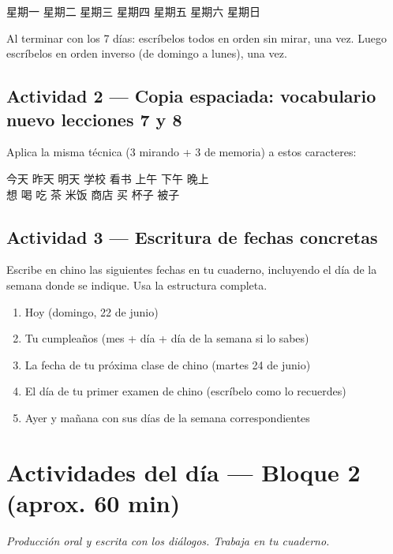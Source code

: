 \documentclass[12pt, a4paper]{article}
\begin{document}
\begin{cuadrogris}
星期一 \quad 星期二 \quad 星期三 \quad 星期四 \quad 星期五 \quad 星期六 \quad 星期日
\end{cuadrogris}

Al terminar con los 7 días: escríbelos todos en orden sin mirar, una vez. Luego escríbelos en orden inverso (de domingo a lunes), una vez.

\subsection{Actividad 2 — Copia espaciada: vocabulario nuevo lecciones 7 y 8}

Aplica la misma técnica (3 mirando + 3 de memoria) a estos caracteres:

\begin{cuadrogris}
今天 \quad 昨天 \quad 明天 \quad 学校 \quad 看书 \quad 上午 \quad 下午 \quad 晚上\\[4pt]
想 \quad 喝 \quad 吃 \quad 茶 \quad 米饭 \quad 商店 \quad 买 \quad 杯子 \quad 被子
\end{cuadrogris}

\subsection{Actividad 3 — Escritura de fechas concretas}

Escribe en chino las siguientes fechas en tu cuaderno, incluyendo el día de la semana donde se indique. Usa la estructura completa.

\begin{enumerate}[leftmargin=1.5cm]
\item Hoy (domingo, 22 de junio)
\item Tu cumpleaños (mes + día + día de la semana si lo sabes)
\item La fecha de tu próxima clase de chino (martes 24 de junio)
\item El día de tu primer examen de chino (escríbelo como lo recuerdes)
\item Ayer y mañana con sus días de la semana correspondientes
\end{enumerate}

\section{Actividades del día — Bloque 2 (aprox. 60 min)}
\textit{Producción oral y escrita con los diálogos. Trabaja en tu cuaderno.}
\end{document}

